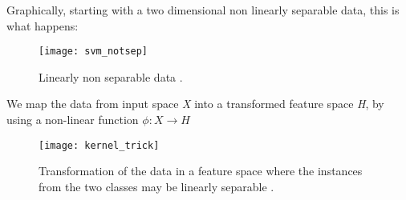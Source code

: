 Graphically, starting with a two dimensional non linearly separable data, this is what happens:
\begin{figure}[H]
	\centering
	\texttt{[image: svm\_notsep]}
	\caption{Linearly non separable data \cite{kernel_trick}.}
\end{figure} 

We map the data from input space \textit{X} into a transformed feature space \textit{H}, by using a non-linear function $\phi: X \rightarrow H$

\begin{figure}[H]
	\centering
	\texttt{[image: kernel\_trick]}
	\caption{Transformation of the data in a feature space where the instances from the two classes may be linearly separable \cite{kernel_trick}.}
\end{figure} 

